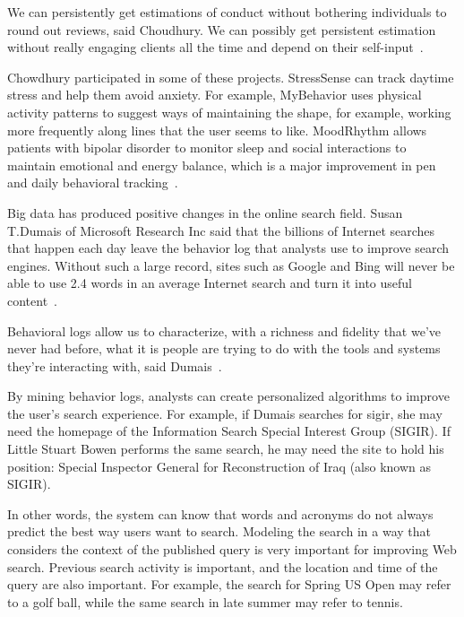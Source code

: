 We can persistently get estimations of conduct without bothering 
individuals to round out reviews, said Choudhury. We can possibly 
get persistent estimation without really engaging clients all 
the time and depend on their self-input~\cite{editor00}.

Chowdhury participated in some of these projects. StressSense can 
track 
daytime stress and help them avoid anxiety. For example, MyBehavior uses 
physical activity patterns to suggest ways of maintaining the shape, for 
example, working more frequently along lines that the user seems to like. 
MoodRhythm allows patients with bipolar disorder to monitor sleep and social 
interactions to maintain emotional and energy balance, which is a major 
improvement in pen and daily behavioral tracking~\cite{editor00}. 

Big data has produced positive changes in the online search field. 
Susan T.Dumais of Microsoft Research Inc said that the billions of 
Internet searches that happen each day leave the behavior log that 
analysts use to improve search engines. Without such a large record, 
sites such as Google and Bing will never be able to use 2.4 words in 
an average Internet search and turn it into useful 
content~\cite{editor00}.

Behavioral logs allow us to characterize, with a richness and fidelity 
that we’ve never had before, what it is people are trying to do with
the tools and systems they’re interacting with, said Dumais~\cite{editor00}.

By mining behavior logs, analysts can create personalized algorithms 
to improve the user's search experience. For example, if Dumais searches 
for sigir, she may need the homepage of the Information Search Special 
Interest Group (SIGIR). If Little Stuart Bowen performs the same 
search, 
he may need the site to hold his position: Special Inspector General 
for Reconstruction of Iraq (also known as SIGIR).

In other words, the system can know that words and acronyms do not always 
predict the best way users want to search. Modeling the search in a way 
that considers the context of the published query is very important for 
improving Web search. Previous search activity is important, and the 
location and time of the query are also important. For example, the 
search for Spring US Open may refer to a golf ball, while the same 
search in late summer may refer to tennis.

